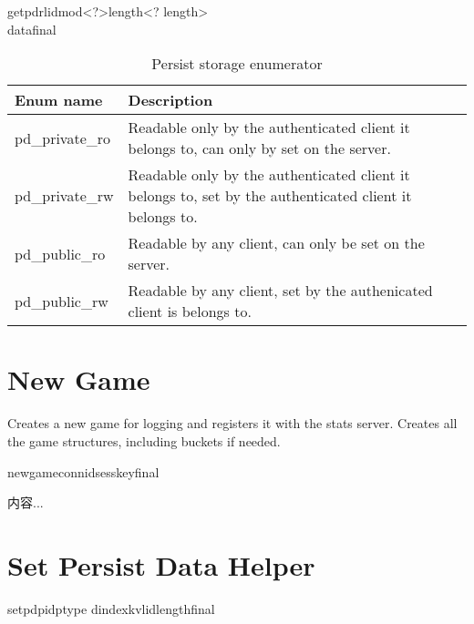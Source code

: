 \documentclass[oneside,titlepage,a4paper]{Definition/retrospy} %
\begin{document}
\begin{mybox}
\tbs getpdr\tbs lid\tbs mod\tbs<?>\tbs length\tbs<? length>\\\tbs data\tbs final\tbs
\end{mybox}

\begin{table}
	\centering
\begin{tabular}{|l|p{8cm}|}
	\hline
	\textbf{Enum name}&\textbf{Description}\\\hline
	pd\_private\_ro& Readable only by the authenticated client it belongs to, can only by set on the server.\\\hline
	pd\_private\_rw& Readable only by the authenticated client it belongs to, set by the authenticated client it belongs to.\\\hline
	pd\_public\_ro& Readable by any client, can only be set on the server.\\\hline
	pd\_public\_rw& Readable by any client, set by the authenicated client is belongs to.\\\hline
\end{tabular}
	\caption{Persist storage enumerator}
\label{Persist storage enumerator}
\end{table}

\section{New Game}
Creates a new game for logging and registers it with the stats server. 
Creates all the game structures, including buckets if needed.
\ClientRequest

\begin{mybox}
	\tbs newgame\tbs\tbs connid\tbs<connection id>\tbs sesskey\tbs<session key>\tbs final\tbs
\end{mybox}

\ServerResponse

\begin{mybox}
	内容...
\end{mybox}

\section{Set Persist Data Helper}
\ClientRequest
\begin{mybox}
	\tbs setpd\tbs pid\tbs<profile id>\tbs ptype\tbs <persist storage type> \tbs dindex\tbs<data index>\tbs kv\tbs<key value flag>\tbs lid\tbs <local id>\tbs length\tbs<size of game defined data>\tbs final\tbs
\end{mybox}
\end{document}
